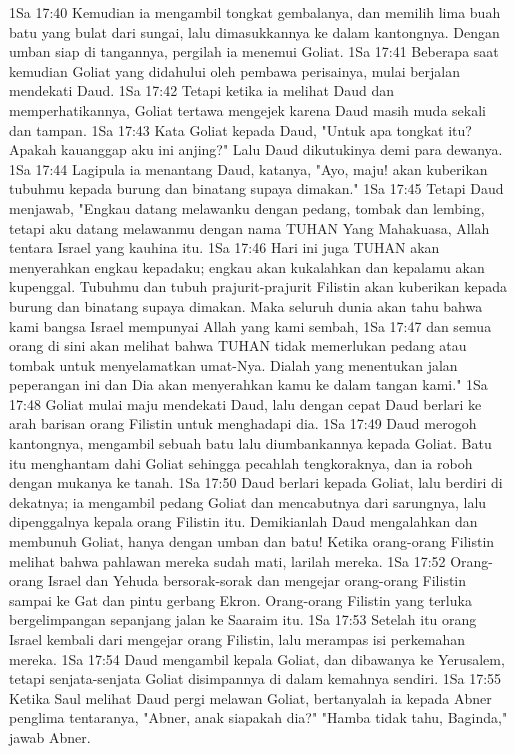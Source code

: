 1Sa 17:40  Kemudian ia mengambil tongkat gembalanya, dan memilih lima buah batu yang bulat dari sungai, lalu dimasukkannya ke dalam kantongnya. Dengan umban siap di tangannya, pergilah ia menemui Goliat.
1Sa 17:41  Beberapa saat kemudian Goliat yang didahului oleh pembawa perisainya, mulai berjalan mendekati Daud.
1Sa 17:42  Tetapi ketika ia melihat Daud dan memperhatikannya, Goliat tertawa mengejek karena Daud masih muda sekali dan tampan.
1Sa 17:43  Kata Goliat kepada Daud, "Untuk apa tongkat itu? Apakah kauanggap aku ini anjing?" Lalu Daud dikutukinya demi para dewanya.
1Sa 17:44  Lagipula ia menantang Daud, katanya, "Ayo, maju! akan kuberikan tubuhmu kepada burung dan binatang supaya dimakan."
1Sa 17:45  Tetapi Daud menjawab, "Engkau datang melawanku dengan pedang, tombak dan lembing, tetapi aku datang melawanmu dengan nama TUHAN Yang Mahakuasa, Allah tentara Israel yang kauhina itu.
1Sa 17:46  Hari ini juga TUHAN akan menyerahkan engkau kepadaku; engkau akan kukalahkan dan kepalamu akan kupenggal. Tubuhmu dan tubuh prajurit-prajurit Filistin akan kuberikan kepada burung dan binatang supaya dimakan. Maka seluruh dunia akan tahu bahwa kami bangsa Israel mempunyai Allah yang kami sembah,
1Sa 17:47  dan semua orang di sini akan melihat bahwa TUHAN tidak memerlukan pedang atau tombak untuk menyelamatkan umat-Nya. Dialah yang menentukan jalan peperangan ini dan Dia akan menyerahkan kamu ke dalam tangan kami."
1Sa 17:48  Goliat mulai maju mendekati Daud, lalu dengan cepat Daud berlari ke arah barisan orang Filistin untuk menghadapi dia.
1Sa 17:49  Daud merogoh kantongnya, mengambil sebuah batu lalu diumbankannya kepada Goliat. Batu itu menghantam dahi Goliat sehingga pecahlah tengkoraknya, dan ia roboh dengan mukanya ke tanah.
1Sa 17:50  Daud berlari kepada Goliat, lalu berdiri di dekatnya; ia mengambil pedang Goliat dan mencabutnya dari sarungnya, lalu dipenggalnya kepala orang Filistin itu. Demikianlah Daud mengalahkan dan membunuh Goliat, hanya dengan umban dan batu! Ketika orang-orang Filistin melihat bahwa pahlawan mereka sudah mati, larilah mereka.
1Sa 17:52  Orang-orang Israel dan Yehuda bersorak-sorak dan mengejar orang-orang Filistin sampai ke Gat dan pintu gerbang Ekron. Orang-orang Filistin yang terluka bergelimpangan sepanjang jalan ke Saaraim itu.
1Sa 17:53  Setelah itu orang Israel kembali dari mengejar orang Filistin, lalu merampas isi perkemahan mereka.
1Sa 17:54  Daud mengambil kepala Goliat, dan dibawanya ke Yerusalem, tetapi senjata-senjata Goliat disimpannya di dalam kemahnya sendiri.
1Sa 17:55  Ketika Saul melihat Daud pergi melawan Goliat, bertanyalah ia kepada Abner penglima tentaranya, "Abner, anak siapakah dia?" "Hamba tidak tahu, Baginda," jawab Abner.
